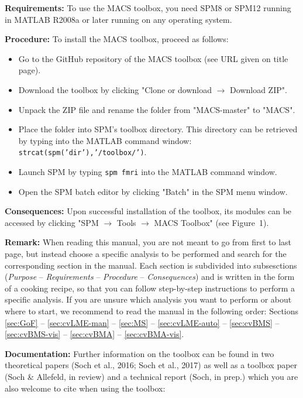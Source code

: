 \documentclass[a4paper,12pt]{article}
\newcommand{\ra}{$\rightarrow$ }
\begin{document}
\textbf{Requirements:} To use the MACS toolbox, you need SPM8 or SPM12 running in \linebreak[4] MATLAB R2008a or later running on any operating system.

\textbf{Procedure:} To install the MACS toolbox, proceed as follows:
\begin{itemize}
	
\item
Go to the GitHub repository of the MACS toolbox (see URL given on title page).

\item
Download the toolbox by clicking "Clone or download \ra Download ZIP".

\item
Unpack the ZIP file and rename the folder from "MACS-master" to "MACS".

\item
Place the folder into SPM's toolbox directory. This directory can be retrieved by typing into the MATLAB command window: \texttt{strcat(spm('dir'),'/toolbox/')}.

\item
Launch SPM by typing \texttt{spm fmri} into the MATLAB command window.

\item
Open the SPM batch editor by clicking "Batch" in the SPM menu window.

\end{itemize}

\textbf{Consequences:} Upon successful installation of the toolbox, its modules can be accessed by clicking "SPM \ra Tools \ra MACS Toolbox" (see Figure~1).

\textbf{Remark:} When reading this manual, you are not meant to go from first to last page, but instead choose a specific analysis to be performed and search for the corresponding section in the manual. Each section is subdivided into subsesctions (\textit{Purpose} -- \textit{Requirements} -- \textit{Procedure} -- \textit{Consequences}) and is written in the form of a cooking recipe, so that you can follow step-by-step instructions to perform a specific analysis. If you are unsure which analysis you want to perform or about where to start, we recommend to read the manual in the following order: Sections \ref{sec:GoF} -- \ref{sec:cvLME-man} -- \ref{sec:MS} -- \ref{sec:cvLME-auto} -- \ref{sec:cvBMS} -- \ref{sec:cvBMS-vis} -- \ref{sec:cvBMA} -- \ref{sec:cvBMA-vis}.

\pagebreak
\textbf{Documentation:} Further information on the toolbox can be found in two theoretical papers (Soch et al., 2016; Soch et al., 2017) as well as a toolbox paper (Soch \& Allefeld, in review) and a technical report (Soch, in prep.) which you are also welcome to cite when using the toolbox:
\end{document}
